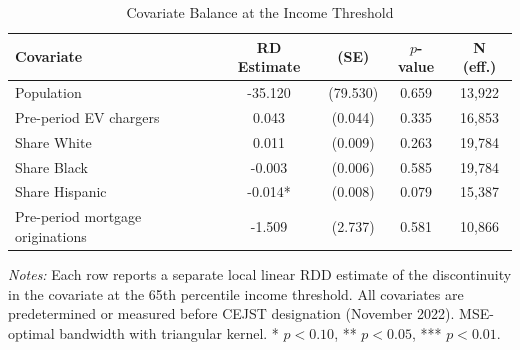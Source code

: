 \begin{table}[H]
\centering
\caption{Covariate Balance at the Income Threshold}
\begin{threeparttable}
\begin{tabular}{lcccc}
\toprule
Covariate & RD Estimate & (SE) & $p$-value & N (eff.) \\
\midrule
Population & -35.120 & (79.530) & 0.659 & 13,922 \\
Pre-period EV chargers & 0.043 & (0.044) & 0.335 & 16,853 \\
Share White & 0.011 & (0.009) & 0.263 & 19,784 \\
Share Black & -0.003 & (0.006) & 0.585 & 19,784 \\
Share Hispanic & -0.014* & (0.008) & 0.079 & 15,387 \\
Pre-period mortgage originations & -1.509 & (2.737) & 0.581 & 10,866 \\
\bottomrule
\end{tabular}
\begin{tablenotes}[flushleft]
\small
\item \textit{Notes:} Each row reports a separate local linear RDD estimate of the discontinuity in the covariate at the 65th percentile income threshold. All covariates are predetermined or measured before CEJST designation (November 2022). MSE-optimal bandwidth with triangular kernel. * $p<0.10$, ** $p<0.05$, *** $p<0.01$.
\end{tablenotes}
\end{threeparttable}
\label{tab:balance}
\end{table}

